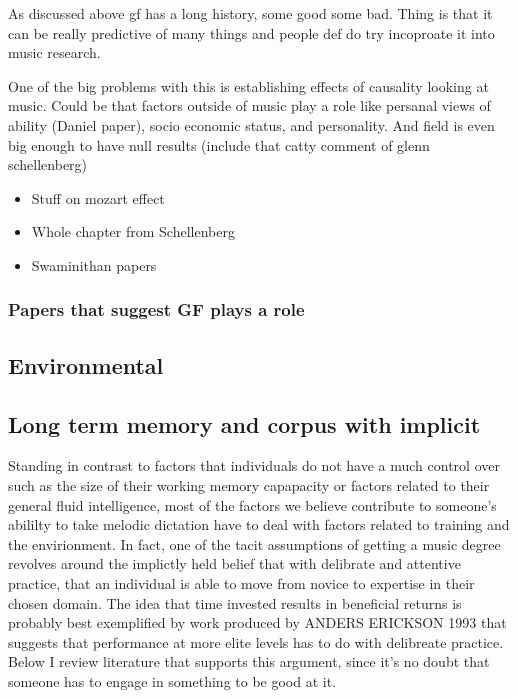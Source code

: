 \documentclass[]{book}
\providecommand{\tightlist}{%
  \setlength{\itemsep}{0pt}\setlength{\parskip}{0pt}}
\theoremstyle{definition}
\theoremstyle{definition}
\theoremstyle{definition}
\theoremstyle{remark}
\begin{document}
As discussed above gf has a long history, some good some bad. Thing is
that it can be really predictive of many things and people def do try
incoproate it into music research.

One of the big problems with this is establishing effects of causality
looking at music. Could be that factors outside of music play a role
like persanal views of ability (Daniel paper), socio economic status,
and personality. And field is even big enough to have null results
(include that catty comment of glenn schellenberg)

\begin{itemize}
\tightlist
\item
  Stuff on mozart effect
\item
  Whole chapter from Schellenberg
\item
  Swaminithan papers
\end{itemize}

\hypertarget{papers-that-suggest-gf-plays-a-role}{%
\subsubsection{Papers that suggest GF plays a
role}\label{papers-that-suggest-gf-plays-a-role}}

\hypertarget{environmental}{%
\subsection{Environmental}\label{environmental}}

\hypertarget{long-term-memory-and-corpus-with-implicit}{%
\subsection{Long term memory and corpus with
implicit}\label{long-term-memory-and-corpus-with-implicit}}

Standing in contrast to factors that individuals do not have a much
control over such as the size of their working memory capapacity or
factors related to their general fluid intelligence, most of the factors
we believe contribute to someone's abililty to take melodic dictation
have to deal with factors related to training and the envirionment. In
fact, one of the tacit assumptions of getting a music degree revolves
around the implictly held belief that with delibrate and attentive
practice, that an individual is able to move from novice to expertise in
their chosen domain. The idea that time invested results in beneficial
returns is probably best exemplified by work produced by ANDERS ERICKSON
1993 that suggests that performance at more elite levels has to do with
delibreate practice. Below I review literature that supports this
argument, since it's no doubt that someone has to engage in something to
be good at it.
\end{document}
